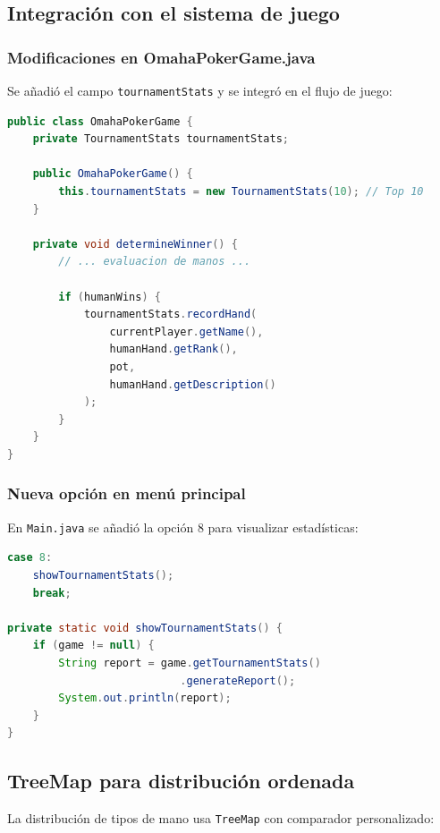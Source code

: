 \documentclass[12pt,a4paper]{article}
\begin{document}
\subsection{Integración con el sistema de juego}

\subsubsection{Modificaciones en OmahaPokerGame.java}

Se añadió el campo \texttt{tournamentStats} y se integró en el flujo de juego:

\begin{lstlisting}[language=Java, caption=Integración en OmahaPokerGame]
public class OmahaPokerGame {
    private TournamentStats tournamentStats;
    
    public OmahaPokerGame() {
        this.tournamentStats = new TournamentStats(10); // Top 10
    }
    
    private void determineWinner() {
        // ... evaluacion de manos ...
        
        if (humanWins) {
            tournamentStats.recordHand(
                currentPlayer.getName(),
                humanHand.getRank(),
                pot,
                humanHand.getDescription()
            );
        }
    }
}
\end{lstlisting}

\subsubsection{Nueva opción en menú principal}

En \texttt{Main.java} se añadió la opción 8 para visualizar estadísticas:

\begin{lstlisting}[language=Java, caption=Opción de menú para estadísticas]
case 8:
    showTournamentStats();
    break;

private static void showTournamentStats() {
    if (game != null) {
        String report = game.getTournamentStats()
                           .generateReport();
        System.out.println(report);
    }
}
\end{lstlisting}

\subsection{TreeMap para distribución ordenada}

La distribución de tipos de mano usa \texttt{TreeMap} con comparador personalizado:
\end{document}
